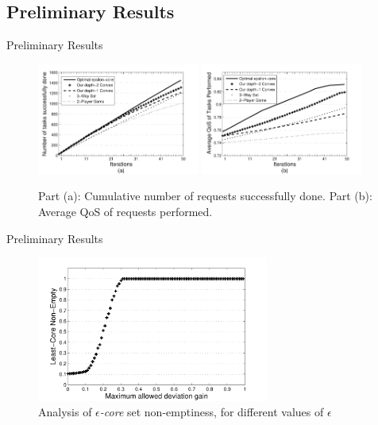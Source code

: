 \documentclass{beamer}
\begin{document}
\subsection{Preliminary Results}
\begin{frame}{Preliminary Results}

    \begin{figure}[!t]
    \centering
    \includegraphics[width=2.1in]{figures/task_done_opt.pdf}
    \includegraphics[width=2.1in]{figures/task_qos_opt.pdf}
    \caption{Part (a): Cumulative number of requests successfully
    done. Part (b): Average QoS of requests performed.}
    \label{performanceall}
    \end{figure}

\end{frame}

\begin{frame}{Preliminary Results}
    \begin{figure}[!t]
        \centering
        \includegraphics[width=3in]{figures/least_core.pdf}
        \caption{Analysis of \emph{$\epsilon$-core} set non-emptiness, for different values of $\epsilon$} \label{f_leastcore}
    \end{figure}
\end{frame}
\end{document}
